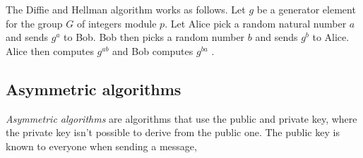 \begin{definition}

    The Diffie and Hellman algorithm works as follows. Let $g$ be a generator
    element for the group $G$ of integers module $p$. Let Alice pick a random
    natural number $a$ and sends $g^a$ to Bob. Bob then picks a random number
    $b$ and sends $g^b$ to Alice. Alice then computes $g^{ab}$ and Bob computes
    $g^{ba}$ \citep{FranciscoRodriguez-Henriquez10}.

\end{definition}

\subsection{Asymmetric algorithms}
\textit{Asymmetric algorithms} are algorithms that use the public and private
key, where the private key isn't possible to derive from the public one. The
public key is known to everyone when sending a message,

